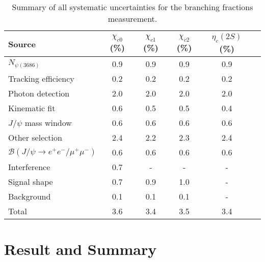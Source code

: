 \documentclass[prd,twocolumn,showpacs,amsmath,amssymb]{revtex4-1}
\begin{document}
\begin{table}[!htbp]
\centering
\caption{\label{sys_all}Summary of all systematic uncertainties for the branching fractions measurement.}
\begin{tabular}{lccccc}
\hline
  Source               & $\chi_{c0}$ (\%) & $\chi_{c1}$ (\%) & $\chi_{c2}$ (\%) & $\eta_{c}(2S)$ (\%) \\
\hline
$N_{\psi(3686)}$       &  0.9             &  0.9             &  0.9             &  0.9         \\
Tracking efficiency    &  0.2             &  0.2             &  0.2             &  0.2         \\
Photon detection       &  2.0             &  2.0             &  2.0             &  2.0         \\
Kinematic fit          &  0.6             &  0.5             &  0.5             &  0.4         \\
$J/\psi$ mass window   &  0.6             &  0.6             &  0.6             &  0.6         \\
Other selection        &  2.4             &  2.2             &  2.3             &  2.4         \\
$\mathcal{B}(J/\psi\to e^{+}e^{-}/\mu^{+}\mu^{-})$ &  0.6  &  0.6  &  0.6       &  0.6         \\
Interference           &  0.7             &  -               &  -               &  -           \\
Signal shape           &  0.7             &  0.9             &  1.0             &  -           \\
Background             &  0.1             &  0.1             &  0.1             &  -           \\
\hline
Total                  &  3.6             &  3.4             &  3.5             &  3.4         \\
\hline
\end{tabular}
\end{table}


\section{Result and Summary}
\end{document}
